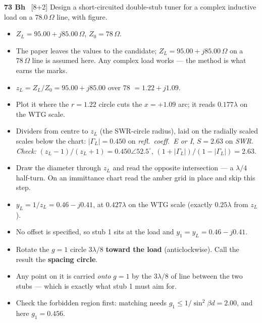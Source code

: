 \begin{asked}{\textbf{73 Bh} \ [8+2]}
Design a short-circuited double-stub tuner for a complex inductive load on a $78.0\,\Omega$ line, with figure.
\end{asked}
\begin{itemize}
  \item $Z_L = 95.00 + j85.00\,\Omega$, $Z_0 = 78\,\Omega$.
  \item \added{} The paper leaves the values to the candidate; $Z_L = 95.00 + j85.00\,\Omega$ on a $78\,\Omega$ line is assumed here. Any complex load works --- the method is what earns the marks.
\end{itemize}
\begin{itemize}
  \item $z_L = Z_L/Z_0 = 95.00 + j85.00$ over $78$ $=1.22 + j1.09$.
  \item Plot it where the $r = 1.22$ circle cuts the $x = +1.09$ arc; it reads $0.177\lambda$ on the WTG scale.
  \item Dividers from centre to $z_L$ (the SWR-circle radius), laid on the radially scaled scales below the chart: $|\Gamma_L| = 0.450$ on \emph{refl.\ coeff.\ E or I}, $S = 2.63$ on \emph{SWR}. \textit{Check:} $(z_L-1)/(z_L+1) = 0.450\angle 52.5^\circ$, $(1+|\Gamma_L|)/(1-|\Gamma_L|) = 2.63$.
\end{itemize}
\begin{itemize}
  \item Draw the diameter through $z_L$ and read the opposite intersection --- a $\lambda/4$ half-turn. On an immittance chart read the amber grid in place and skip this step.
  \item $y_L = 1/z_L = 0.46 - j0.41$, at $0.427\lambda$ on the WTG scale (exactly $0.25\lambda$ from $z_L$).
\end{itemize}
\begin{itemize}
  \item No offset is specified, so stub 1 sits at the load and $y_1 = y_L = 0.46 - j0.41$.
\end{itemize}
\begin{itemize}
  \item Rotate the $g=1$ circle $3\lambda/8$ \textbf{toward the load} (anticlockwise). Call the result the \textbf{spacing circle}.
  \item Any point on it is carried \emph{onto} $g=1$ by the $3\lambda/8$ of line between the two stubs --- which is exactly what stub 1 must aim for.
  \item Check the forbidden region first: matching needs $g_1 \le 1/\sin^2\beta d = 2.00$, and here $g_1 = 0.456$. \checkmark
\end{itemize}
